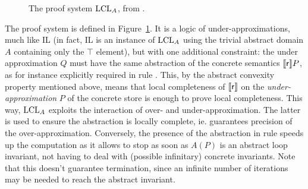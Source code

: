 \begin{figure*}[t]
	\centering
	\begin{framed}
	\end{framed}
	\vspace{-1ex}
	\caption{The proof system $\text{LCL}_A$, from \cite{BGGR21}.}\label{fig:sota:lcla-rules}
\end{figure*}
The proof system is defined in Figure~\ref{fig:sota:lcla-rules}. It is a logic of under-approximations, much like IL (in fact, IL is an instance of $\text{LCL}_A$ using the trivial abstract domain $A$ containing only the $\top$ element), but with one additional constraint: the under approximation $Q$ must have the same abstraction of the concrete semantics $\llbracket\mathsf{r}\rrbracket P$, as for instance explicitly required in rule . This, by the abstract convexity property mentioned above, means that local completeness of $\llbracket\mathsf{r}\rrbracket$ on the \emph{under-approximation} $P$ of the concrete store is enough to prove local completeness.
This way, $\text{LCL}_A$ exploits the interaction of over- and under-approximation. The latter is used to ensure the abstraction is locally complete, ie. guarantees precision of the over-approximation. Conversely, the presence of the abstraction in rule  speeds up the computation as it allows to stop as soon as $A(P)$ is an abstract loop invariant, not having to deal with (possible infinitary) concrete invariants. Note that this doesn't guarantee termination, since an infinite number of iterations may be needed to reach the abstract invariant.

